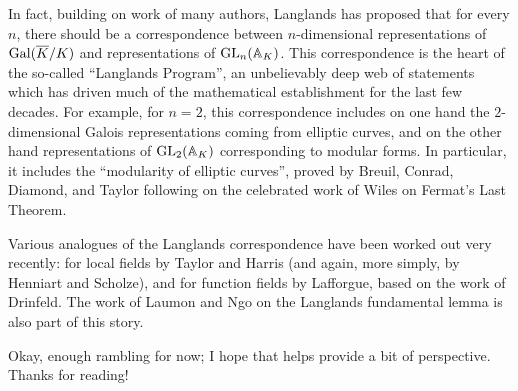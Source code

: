 In fact, building on work of many authors, Langlands has proposed that for
every $n$, there should be a correspondence between
$n$-dimensional representations of $\operatorname{Gal}(\overline{K}/K)$ and representations
of $\operatorname{GL}_n(\mathbb{A}_K)$. This correspondence is the heart of the
so-called ``Langlands Program'', an unbelievably deep web of statements
which has driven much of the mathematical establishment for the last few 
decades. For example, for $n=2$, this correspondence includes on one hand
the $2$-dimensional Galois representations coming from elliptic curves,
and on the other hand representations of $\operatorname{GL}_2(\mathbb{A}_K)$ corresponding to
modular forms. In particular, it includes the ``modularity of elliptic
curves'', proved by Breuil, Conrad, Diamond, and Taylor following on the
celebrated work of Wiles on Fermat's Last Theorem.

Various analogues of the Langlands correspondence have been worked out
very recently: for local fields by Taylor and Harris (and again, more
simply, by Henniart and Scholze), and for function fields by Lafforgue, based on the 
work of Drinfeld. The work of Laumon and Ngo on the Langlands fundamental lemma is also part of this story.

Okay, enough rambling for now; I hope that helps provide a bit of perspective.
Thanks for reading!

%


